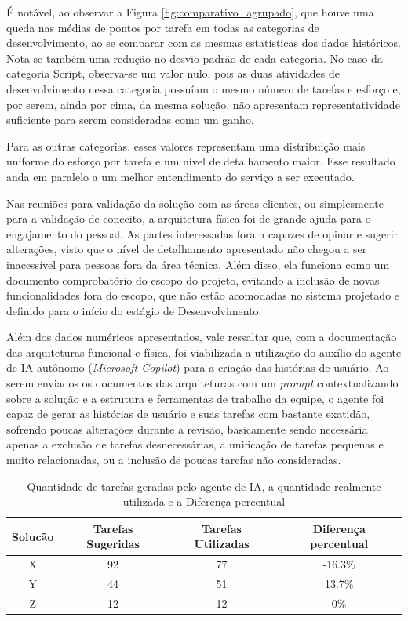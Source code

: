 	É notável, ao observar a Figura \ref{fig:comparativo_agrupado}, que houve uma queda nas médias de pontos por tarefa em todas as categorias de desenvolvimento, ao se comparar com as mesmas estatísticas dos dados históricos.
	Nota-se também uma redução no desvio padrão de cada categoria. No caso da categoria Script, observa-se um valor nulo, pois as duas atividades de desenvolvimento nessa categoria
	possuíam o mesmo número de tarefas e esforço e, por serem, ainda por cima, da mesma solução, não apresentam representatividade suficiente para serem consideradas como um ganho.

	Para as outras categorias, esses valores representam uma distribuição mais uniforme do esforço por tarefa e um nível de detalhamento maior. Esse resultado anda em paralelo a
	um melhor entendimento do serviço a ser executado.

	Nas reuniões para validação da solução com as áreas clientes, ou simplesmente para a validação de conceito, a arquitetura física foi de grande ajuda para o engajamento do pessoal. As partes interessadas
	foram capazes de opinar e sugerir alterações, visto que o nível de detalhamento apresentado não chegou a ser inacessível para pessoas fora da área técnica. Além disso, ela funciona como um documento comprobatório do escopo do projeto, evitando a
	inclusão de novas funcionalidades fora do escopo, que não estão acomodadas no sistema projetado e definido para o início do estágio de Desenvolvimento.

	Além dos dados numéricos apresentados, vale ressaltar que, com a documentação das arquiteturas funcional e física, foi viabilizada a utilização do auxílio
	do agente de IA autônomo (\textit{Microsoft Copilot}) para a criação das histórias de usuário. Ao serem enviados os documentos das arquiteturas com um \textit{prompt} contextualizando sobre a solução e
	a estrutura e ferramentas de trabalho da equipe, o agente foi capaz de gerar as histórias de usuário e suas tarefas com bastante exatidão, sofrendo poucas alterações durante a
	revisão, basicamente sendo necessária apenas a exclusão de tarefas desnecessárias, a unificação de tarefas pequenas e muito relacionadas, ou a inclusão de poucas tarefas não consideradas.

	\begin{table}[!htb]
		\centering
		\begin{tabular}{cccc}
			\toprule
			\textbf{Solucão} & \textbf{Tarefas Sugeridas} & \textbf{Tarefas Utilizadas} & \textbf{Diferença percentual} \\
			\midrule
			X & 92  & 77 & -16.3\% \\
			Y & 44  & 51 & 13.7\% \\
			Z & 12  & 12 & 0\% \\
			\bottomrule
		\end{tabular}
		\caption{Quantidade de tarefas geradas pelo agente de IA, a quantidade realmente utilizada e a Diferença percentual}
		\label{tab:tarefas_copilot}
	\end{table}
	
